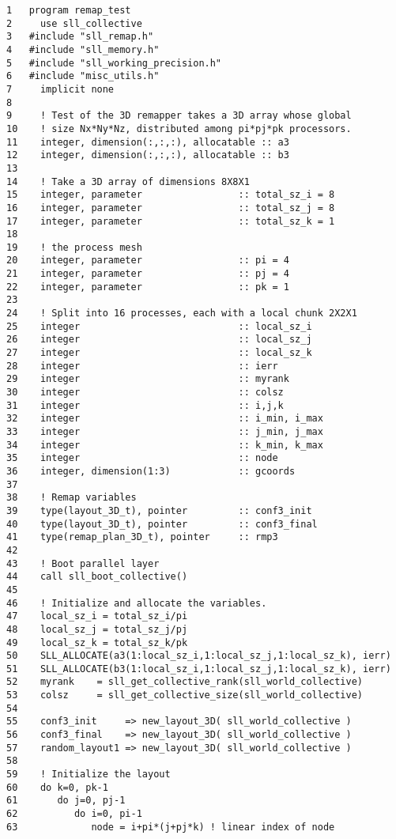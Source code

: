 \documentclass[]{report}   %
\begin{document}
\begin{verbatim}
1   program remap_test
2     use sll_collective
3   #include "sll_remap.h"
4   #include "sll_memory.h"
5   #include "sll_working_precision.h"
6   #include "misc_utils.h"
7     implicit none
8
9     ! Test of the 3D remapper takes a 3D array whose global 
10    ! size Nx*Ny*Nz, distributed among pi*pj*pk processors.
11    integer, dimension(:,:,:), allocatable :: a3
12    integer, dimension(:,:,:), allocatable :: b3
13 
14    ! Take a 3D array of dimensions 8X8X1
15    integer, parameter                 :: total_sz_i = 8
16    integer, parameter                 :: total_sz_j = 8
17    integer, parameter                 :: total_sz_k = 1
18  
19    ! the process mesh
20    integer, parameter                 :: pi = 4
21    integer, parameter                 :: pj = 4
22    integer, parameter                 :: pk = 1
23
24    ! Split into 16 processes, each with a local chunk 2X2X1
25    integer                            :: local_sz_i 
26    integer                            :: local_sz_j 
27    integer                            :: local_sz_k 
28    integer                            :: ierr
29    integer                            :: myrank
30    integer                            :: colsz  
31    integer                            :: i,j,k
32    integer                            :: i_min, i_max
33    integer                            :: j_min, j_max
34    integer                            :: k_min, k_max
35    integer                            :: node
36    integer, dimension(1:3)            :: gcoords
37  
38    ! Remap variables
39    type(layout_3D_t), pointer         :: conf3_init
40    type(layout_3D_t), pointer         :: conf3_final
41    type(remap_plan_3D_t), pointer     :: rmp3
42
43    ! Boot parallel layer
44    call sll_boot_collective()
45
46    ! Initialize and allocate the variables.
47    local_sz_i = total_sz_i/pi
48    local_sz_j = total_sz_j/pj
49    local_sz_k = total_sz_k/pk
50    SLL_ALLOCATE(a3(1:local_sz_i,1:local_sz_j,1:local_sz_k), ierr)
51    SLL_ALLOCATE(b3(1:local_sz_i,1:local_sz_j,1:local_sz_k), ierr)
52    myrank    = sll_get_collective_rank(sll_world_collective)
53    colsz     = sll_get_collective_size(sll_world_collective)
54
55    conf3_init     => new_layout_3D( sll_world_collective )
56    conf3_final    => new_layout_3D( sll_world_collective )
57    random_layout1 => new_layout_3D( sll_world_collective )
58
59    ! Initialize the layout
60    do k=0, pk-1
61       do j=0, pj-1
62          do i=0, pi-1
63             node = i+pi*(j+pj*k) ! linear index of node

\end{verbatim}
\end{document}
